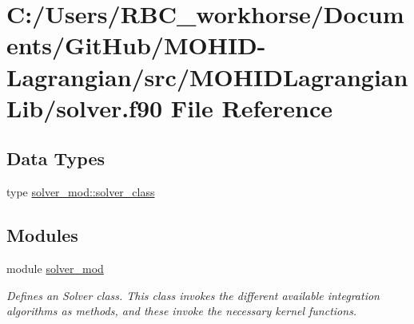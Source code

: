 \hypertarget{solver_8f90}{}\section{C\+:/\+Users/\+R\+B\+C\+\_\+workhorse/\+Documents/\+Git\+Hub/\+M\+O\+H\+I\+D-\/\+Lagrangian/src/\+M\+O\+H\+I\+D\+Lagrangian\+Lib/solver.f90 File Reference}
\label{solver_8f90}
\subsection*{Data Types}
\begin{DoxyCompactItemize}
\item 
type \mbox{\hyperlink{structsolver__mod_1_1solver__class}{solver\+\_\+mod\+::solver\+\_\+class}}
\end{DoxyCompactItemize}
\subsection*{Modules}
\begin{DoxyCompactItemize}
\item 
module \mbox{\hyperlink{namespacesolver__mod}{solver\+\_\+mod}}
\begin{DoxyCompactList}\small\item\em Defines an Solver class. This class invokes the different available integration algorithms as methods, and these invoke the necessary kernel functions. \end{DoxyCompactList}\end{DoxyCompactItemize}
